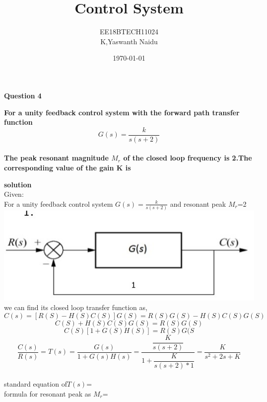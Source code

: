 \documentclass{beamer}
\begin{document}
\title[EE2227]{Control System}
\author{EE18BTECH11024\\K,Yaswanth Naidu}
\date{\today}



\begin{frame}
  \titlepage
\end{frame}
\item \textbf{Question 4}
\item \textbf{  For a unity feedback control system with the forward path transfer function
    $${G(s)} = \frac{k}{s(s+2)}$$
\\The peak resonant magnitude $M_{r}$ of the closed loop frequency is 2.The corresponding value of the gain K is
 }
\item \textbf{solution}
\\Given:
\\ For a unity feedback control system ${G(s)} = \frac{k}{s(s+2)}$ and resonant peak $M_{r}$=2
\includegraphics[width=.6\textwidth]{yeswanth (2).jpg}
\\we can find its closed loop transfer function as,
\begin{equation}
    C(s)=[R(S)-H(S)C(S)]G(S)=R(S)G(S)-H(S)C(S)G(S)
\end{equation}
\begin{equation}
    C(S)+H(S)C(S)G(S)=R(S)G(S)
\end{equation}
\begin{equation}
    C(S)[1+G(S)H(S)]=R(S)G(S
\end{equation}
\begin{equation}
    \dfrac{C(s)}{R(s)}=T(s)=\dfrac{G(s)}{1+G(s)H(s)}=\dfrac{\dfrac{K}{s(s+2)}}{1+\dfrac{K}{s(s+2)*1}}=\dfrac{K}{s^2+2s+K}
\end{equation}
\\standard equation of$T(s)$=
\\formula for resonant peak as $M_{r}$=
\end{document}
